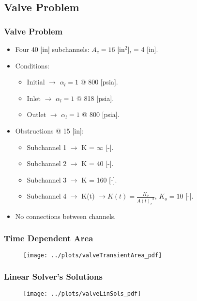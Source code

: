 \documentclass[compress,xcolor=table]{beamer}
\begin{document}
\subsection[Valve Problem]{Valve Problem}
\begin{frame}
\frametitle{Valve Problem}

\begin{itemize}
\item{Four 40 [in] subchannels: $A_{c} = 16$ [in$^{2}$], \dx{} = 4 [in].}
\item{Conditions:
	\begin{itemize}
	\item{Initial $\rightarrow$ $\alpha_{l} = 1$ @ 800 [psia].}
	\item{Inlet $\rightarrow$ $\alpha_{l} = 1$ @ 818 [psia].}
	\item{Outlet $\rightarrow$ $\alpha_{l} = 1$ @ 800 [psia].}
	\end{itemize}
}
\item{Obstructions @ 15 [in]:
\begin{itemize}
	\item{Subchannel 1 $\rightarrow$ K = $\infty$ [-].}
	\item{Subchannel 2 $\rightarrow$ K = 40 [-].}
	\item{Subchannel 3 $\rightarrow$ K = 160 [-].}
	\item{Subchannel 4 $\rightarrow$ K(t) $\rightarrow K(t) = \frac{K_{o}}{{A(t)_r}^2}$, $K_{o} = 10$ [-].}
\end{itemize}
}
\item{No connections between channels.}
\end{itemize}

\end{frame}
\begin{frame}
\frametitle{Time Dependent Area}

\begin{figure}[h!t]
\centering
\texttt{[image: ../plots/valveTransientArea\_pdf]}
\end{figure}

\end{frame}
\begin{frame}
\frametitle{Linear Solver's Solutions}

\begin{figure}[h!t]
\centering
\texttt{[image: ../plots/valveLinSols\_pdf]}
\end{figure}

\end{frame}
\end{document}
